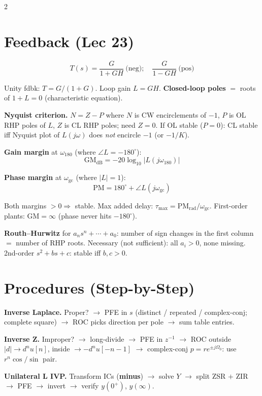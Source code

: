 \documentclass[12pt]{extarticle}
\begin{document}
\begin{multicols*}{2}
\section*{Feedback (Lec 23)}

\[
T(s) = \frac{G}{1+GH}\ \text{(neg)}; \quad \frac{G}{1-GH}\ \text{(pos)}
\]

Unity fdbk: $T = G/(1+G)$. Loop gain $L = GH$. \textbf{Closed-loop poles} $=$ roots of $1+L = 0$ (characteristic equation).

\textbf{Nyquist criterion.} $N = Z - P$ where $N$ is CW encirclements of $-1$, $P$ is OL RHP poles of $L$, $Z$ is CL RHP poles; need $Z=0$. If OL stable ($P=0$): CL stable iff Nyquist plot of $L(j\omega)$ does \emph{not} encircle $-1$ (or $-1/K$).

\textbf{Gain margin} at $\omega_{180}$ (where $\angle L = -180^\circ$):
\[
\mathrm{GM}_\mathrm{dB} = -20\log_{10}|L(j\omega_{180})|
\]

\textbf{Phase margin} at $\omega_\text{gc}$ (where $|L| = 1$):
\[
\mathrm{PM} = 180^\circ + \angle L(j\omega_\text{gc})
\]

Both margins $> 0 \Rightarrow$ stable. Max added delay: $\tau_{\max} = \mathrm{PM}_\mathrm{rad}/\omega_\text{gc}$. First-order plants: $\mathrm{GM} = \infty$ (phase never hits $-180^\circ$).

\textbf{Routh--Hurwitz} for $a_n s^n + \cdots + a_0$: number of sign changes in the first column $=$ number of RHP roots. Necessary (not sufficient): all $a_i > 0$, none missing. 2nd-order $s^2 + bs + c$: stable iff $b, c > 0$.

\section*{Procedures (Step-by-Step)}

\textbf{Inverse Laplace.} Proper? $\to$ PFE in $s$ (distinct / repeated / complex-conj; complete square) $\to$ ROC picks direction per pole $\to$ sum table entries.

\textbf{Inverse Z.} Improper? $\to$ long-divide $\to$ PFE in $z^{-1}$ $\to$ ROC outside $|d|\to d^n u[n]$, inside $\to -d^n u[-n-1]$ $\to$ complex-conj $p=re^{\pm j\Omega_0}$: use $r^n \cos/\sin$ pair.

\textbf{Unilateral L IVP.} Transform ICs (\textbf{minus}) $\to$ solve $Y$ $\to$ split ZSR $+$ ZIR $\to$ PFE $\to$ invert $\to$ verify $y(0^+)$, $y(\infty)$.


\end{multicols*}
\end{document}
